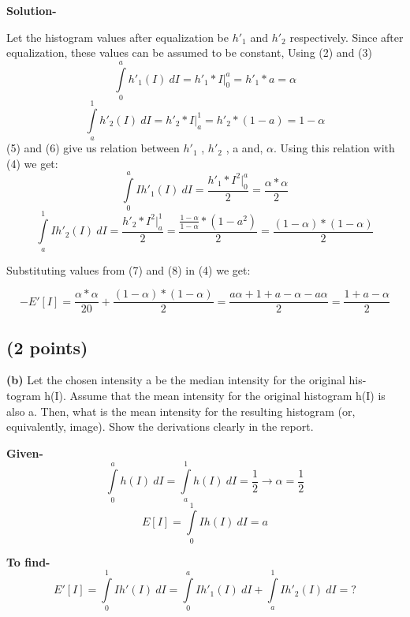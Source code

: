 \documentclass{article}
\begin{document}
\textbf{Solution-}

Let the histogram values after equalization be $h'_1$ and $h'_2$ respectively. Since after equalization, these values can be assumed to be constant,
Using (2) and (3)
\begin{equation} \int\limits_0^a h'_1(I) \ dI = h'_1 * I|_0^a = h'_1 * a = \alpha\end{equation}
\begin{equation} \int\limits_a^1 h'_2(I) \ dI = h'_2 * I|_a^1 = h'_2 *(1-a) = 1-\alpha\end{equation}
(5) and (6) give us relation between $h'_1$ , $h'_2$ , a and, $\alpha$. Using this relation
with (4) we get:
\begin{equation} \int\limits_0^a I h'_1(I) \ dI =\frac{h'_1 * I^2|_0^a}{2}= \frac{\alpha*\alpha}{2}\end{equation}
\begin{equation} \int\limits_a^1 I h'_2(I) \ dI =\frac{h'_2 * I^2|_a^1}{2}=\frac{\frac{1-\alpha}{1-\alpha}*(1-a^2)}{2}= \frac{(1-\alpha)*(1-\alpha)}{2}\end{equation}

Substituting values from (7) and (8) in (4) we get:

\begin{equation}-E'[I] = \frac{\alpha*\alpha}{20}+\frac{(1-\alpha)*(1-\alpha)}{2}=\frac{a\alpha+1+a-\alpha-a\alpha}{2}=\frac{1+a-\alpha}{2}\end{equation}
\subsection{(2 points)}
\textbf{(b)} Let the chosen intensity a be the median intensity for the original his-
togram h(I). Assume that the mean intensity for the original histogram h(I)
is also a. Then, what is the mean intensity for the resulting histogram (or,
equivalently, image). Show the derivations clearly in the report.

\textbf{Given-}
\begin{equation}\int\limits_0^a h(I) \ dI =\int\limits_a^1 h(I) \ dI = \frac{1}{2} \rightarrow \alpha = \frac{1}{2}\end{equation}
\begin{equation}E[I] = \int\limits_0^1 I h(I) \ dI =a\end{equation}

\textbf{To find-}
\begin{equation}E'[I] = \int\limits_0^1 I h'(I) \ dI = \int\limits_0^a I h'_1(I) \ dI + \int\limits_a^1 Ih'_2(I) \ dI = ?\end{equation}
\end{document}
